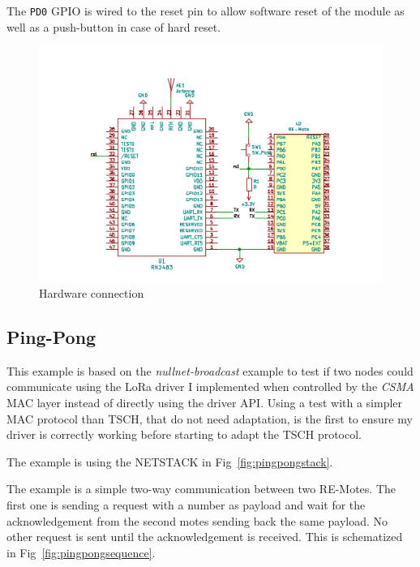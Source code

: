 The \lstinline{PD0} GPIO is wired to the reset pin to allow
software reset of the module as well as a push-button in case of hard reset.

\begin{figure}[H]
  \centering
  \includegraphics[scale=0.70]{thesis.tex/chapters/driver/fig/conn_diag.pdf}
  \caption{Hardware connection\label{fig:schemaconn}}
\end{figure}

\subsection{Ping-Pong\label{section:pingpong}}

This example is based on the \emph{nullnet-broadcast} example to test if two
nodes could communicate using the LoRa driver I implemented when controlled by
the \emph{CSMA} MAC layer instead of directly using the driver API\@.
Using a test with a simpler MAC protocol than TSCH, that do not need adaptation,
is the first to ensure my driver is correctly working before starting to adapt
the TSCH protocol.

The example is using the NETSTACK in Fig~\ref{fig:pingpongstack}.



The example is a simple two-way communication between two RE-Motes.
The first one is sending a request with a number as
payload and wait for the acknowledgement from the second motes sending back
the same payload.
No other request is sent until the acknowledgement is received.
This is schematized in Fig~\ref{fig:pingpongsequence}.

